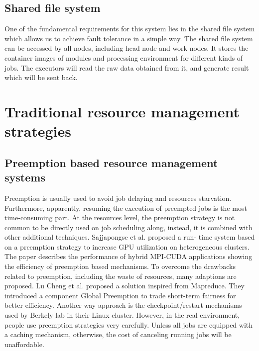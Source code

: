 \subsection{Shared file system}
One of the fundamental requirements for this system lies in the shared file system which
allows us to achieve fault tolerance in a simple way. The shared file system can be accessed
by all nodes, including head node and work nodes. It stores the container images of modules
and processing environment for different kinds of jobs. The executors will read the raw
data obtained from it, and generate result which will be sent back.

\section{Traditional resource management strategies}
\subsection{Preemption based resource management systems}
Preemption is usually used to avoid job delaying and resources starvation. 
Furthermore, apparently, resuming the execution of  preempted jobs is the most time-consuming part. 
At the resources level, the preemption strategy is not common to be directly used on job scheduling along, instead, it is combined with other additional techniques. 
Sajjapongse et al. \cite{sajjapongse2013preemption} proposed a run- time system based on a preemption strategy to increase GPU utilization on heterogeneous clusters. 
The paper describes the performance of hybrid MPI-CUDA applications showing the efficiency of preemption based mechanisms. 
To overcome the drawbacks related to preemption, including the waste of resources, many adaptions are proposed. 
Lu Cheng et al. \cite{6103959} proposed a solution inspired from Mapreduce. 
They introduced a component Global Preemption to trade short-term fairness for better efficiency. 
Another way approach is the checkpoint/restart mechanisms used by Berkely lab\cite{hargrove2006berkeley} in their Linux cluster. 
However, in the real environment, people use preemption strategies very carefully. 
Unless all jobs are equipped with a caching mechanism, otherwise, the cost of canceling running jobs will be unaffordable.

